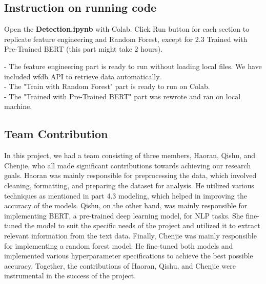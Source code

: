 \subsection{Instruction on running code}

Open the \textbf{Detection.ipynb} with Colab. Click Run button for each section to replicate feature engineering and Random Forest, except for 2.3 Trained with Pre-Trained BERT (this part might take 2 hours).

- The feature engineering part is ready to run without loading local files. We have included wfdb API to retrieve data automatically. \\
- The "Train with Random Forest" part is ready to run on Colab. \\
- The "Trained with Pre-Trained BERT" part was rewrote and ran on local machine. \\

\subsection{Team Contribution}
In this project, we had a team consisting of three members, Haoran, Qishu, and Chenjie, who all made significant contributions towards achieving our research goals. Haoran was mainly responsible for preprocessing the data, which involved cleaning, formatting, and preparing the dataset for analysis. He utilized various techniques as mentioned in part 4.3 modeling, which helped in improving the accuracy of the models. Qishu, on the other hand, was mainly responsible for implementing BERT, a pre-trained deep learning model, for NLP tasks. She fine-tuned the model to suit the specific needs of the project and utilized it to extract relevant information from the text data. Finally, Chenjie was mainly responsible for implementing a random forest model. He fine-tuned both models and implemented various hyperparameter specifications to achieve the best possible accuracy. Together, the contributions of Haoran, Qishu, and Chenjie were instrumental in the success of the project.